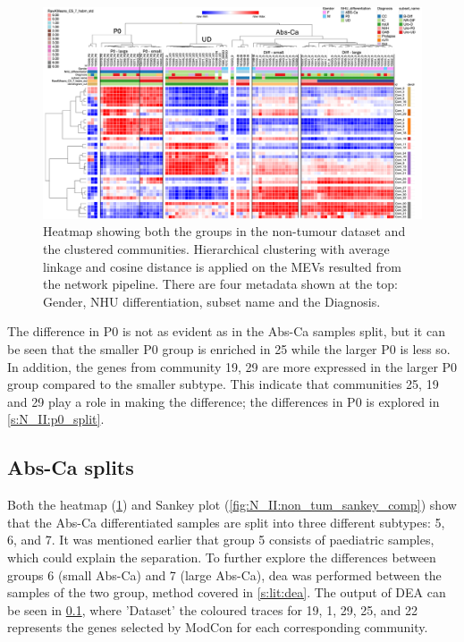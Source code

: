 \begin{figure}
    \includegraphics[width=1.0\textwidth,height=1.0\textheight,keepaspectratio]{Sections/Network_II/resources/non_tum/rotated_healthy_std_3.1.png}

    \caption{Heatmap showing both the groups in the non-tumour dataset and the clustered communities. Hierarchical clustering with average linkage and cosine distance is applied on the MEVs resulted from the network pipeline. There are four metadata shown at the top: Gender, NHU differentiation, subset name and the Diagnosis. }
    \label{fig:N_II:morph_non_tum}
\end{figure}


The difference in P0 is not as evident as in the Abs-Ca samples split, but it can be seen that the smaller P0 group is enriched in 25 while the larger P0 is less so. In addition, the genes from community 19, 29 are more expressed in the larger P0 group compared to the smaller subtype. This indicate that communities 25, 19 and 29 play a role in making the difference; the differences in P0 is explored in \cref{s:N_II:p0_split}.

\subsection{Abs-Ca splits} \label{s:N_II:diff_split}

Both the heatmap (\cref{fig:N_II:morph_non_tum}) and Sankey plot (\cref{fig:N_II:non_tum_sankey_comp}) show that the Abs-Ca differentiated samples are split into three different subtypes: 5, 6, and 7. It was mentioned earlier that group 5 consists of paediatric samples, which could explain the separation. To further explore the differences between groups 6 (small Abs-Ca) and 7 (large Abs-Ca), \acrlong{dea} was performed between the samples of the two group, method covered in \cref{s:lit:dea}. The output of DEA can be seen in \cref{s:N_II:diff_split}, where 'Dataset' the coloured traces for 19, 1, 29, 25, and 22 represents the genes selected by ModCon for each corresponding community.

